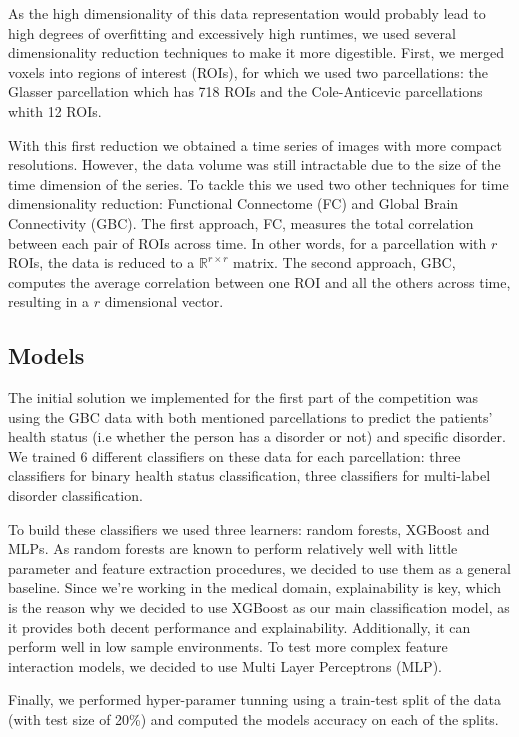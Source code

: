 \documentclass[fleqn,moreauthors,10pt]{ds_report}
\begin{document}
As the high dimensionality of this data representation would probably lead to high degrees of overfitting and excessively high runtimes, we used several dimensionality reduction techniques to make it more digestible. First, we merged voxels into regions of interest (ROIs), for which we used two parcellations: the Glasser parcellation which has 718 ROIs and the Cole-Anticevic parcellations whith 12 ROIs.

With this first reduction we obtained a time series of images with more compact resolutions. However, the data volume was still intractable due to the size of the time dimension of the series. To tackle this we used two other techniques for time dimensionality reduction: Functional Connectome (FC) and Global Brain Connectivity (GBC). The first approach, FC, measures the total correlation between each pair of ROIs across time. In other words, for a parcellation with $r$ ROIs, the data is reduced to a $\mathbb{R}^{r\times r}$ matrix. The second approach, GBC, computes the average correlation between one ROI and all the others across time, resulting in a $r$ dimensional vector. 

\subsection*{Models}
The initial solution we implemented for the first part of the competition was using the GBC data with both mentioned parcellations to predict the patients' health status (i.e whether the person has a disorder or not) and specific disorder. We trained 6 different classifiers on these data for each parcellation: three classifiers for binary health status classification, three classifiers for multi-label disorder classification. 

To build these classifiers we used three learners: random forests, XGBoost and MLPs. As random forests are known to perform relatively well with little parameter and feature extraction procedures, we decided to use them as a general baseline. Since we're working in the medical domain, explainability is key, which is the reason why we decided to use XGBoost as our main classification model, as it provides both decent performance and explainability. Additionally, it can perform well in low sample environments. To test more complex feature interaction models, we decided to use Multi Layer Perceptrons (MLP). 

Finally, we performed hyper-paramer tunning using a train-test split of the data (with test size of 20\%) and computed the models accuracy on each of the splits. 
\end{document}
